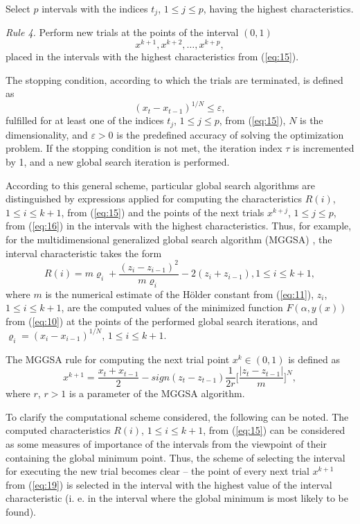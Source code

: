 \documentclass[runningheads]{llncs}
\begin{document}
Select $p$ intervals with the indices $t_j$, $1 \leq j \leq p$, having the highest characteristics.

\textit{Rule 4.} Perform new trials at the points of the interval $(0,1)$
\begin{equation}
 x^{k+1}, x^{k+2},\dots,x^{k+p},
\label{eq:16}
\end{equation}
placed in the intervals with the highest characteristics from (\ref{eq:15}). 

The stopping condition, according to which the trials are terminated, is defined as 
\begin{equation}
 (x_t-x_{t-1})^{1/N} \leq \varepsilon,
\label{eq:17}
\end{equation}
fulfilled for at least one of the indices $t_j$, $1 \leq j \leq p$, from (\ref{eq:15}), $N$ is the dimensionality, and $\varepsilon > 0$ is the predefined accuracy of solving the optimization problem. If the stopping condition is not met, the iteration index $\tau$ is incremented by 1, and a new global search iteration is performed.

According to this general scheme, particular global search algorithms are distinguished by expressions applied for computing the characteristics $R(i)$, $1 \leq i \leq k+1$, from (\ref{eq:15}) and the points of the next trials $x^{k+j}$, $1 \leq j \leq p$, from (\ref{eq:16}) in the intervals with the highest characteristics. Thus, for example, for the multidimensional generalized global search algorithm  (MGGSA) \cite{c10}, the interval characteristic takes the form 
\begin{equation}
 R(i) = m \varrho_i + \frac{(z_i-z_{i-1})^2}{m \varrho_i} - 2 (z_i+z_{i-1}), 1 \leq i \leq k+1 ,
\label{eq:18}
\end{equation}
where $m$ is the numerical estimate of the H\"{o}lder constant from (\ref{eq:11}), $z_i$, $1 \leq i \leq k+1$, are the computed values of the minimized function $F(\alpha,y(x))$ from (\ref{eq:10}) at the points of the performed global search iterations, and $\varrho_i = (x_i - x_{i-1})^{1/N}$, $1 \leq i \leq k+1$.

The MGGSA rule for computing the next trial point $x^k \in (0,1)$ is defined as
\begin{equation}
 x^{k+1} = \frac{x_t + x_{t-1}}{2}-sign(z_t-z_{t-1})\frac{1}{2r}\bigl[\frac{|z_t-z_{t-1}|}{m}\bigr]^N, 
\label{eq:19}
\end{equation}
where $r$, $r>1$ is a parameter of the MGGSA algorithm.

To clarify the computational scheme considered, the following can be noted. The computed characteristics $R(i)$, $1 \leq i \leq k+1$, from (\ref{eq:15}) can be considered as some measures of importance of the intervals from the viewpoint of their containing the global minimum point. Thus, the scheme of selecting the interval for executing the new trial becomes clear -- the point of every next trial $x^{k+1}$ from (\ref{eq:19}) is selected in the interval with the highest value of the interval characteristic (i. e. in the interval where the global minimum is most likely to be found).
\end{document}
